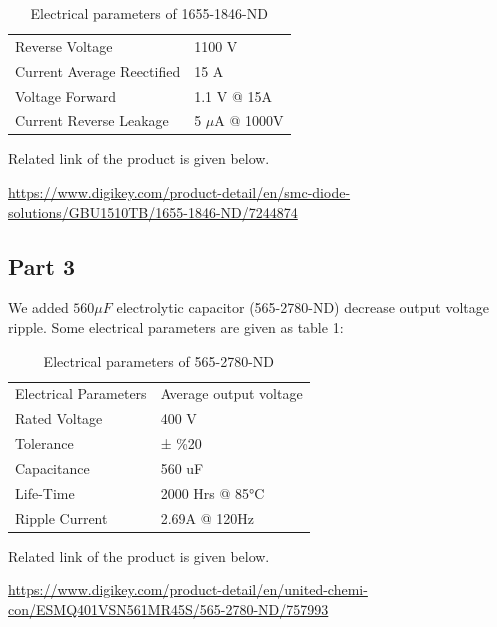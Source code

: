 \documentclass[fleqn, a4paper]{article}
\begin{document}
\begin{table}[H]
\centering
\begin{tabular}{ll}

Reverse Voltage                   & 1100 V               \\
Current Average Reectified        & 15 A                \\
Voltage Forward                   & 1.1 V @ 15A        \\
Current Reverse Leakage           & 5 $\mu$A  @ 1000V         
\end{tabular}
\caption{Electrical parameters of 1655-1846-ND}
\end{table}
Related link of the product is given below.

\url {https://www.digikey.com/product-detail/en/smc-diode-solutions/GBU1510TB/1655-1846-ND/7244874}

\subsection*{Part 3}
We added $560 \mu F $ electrolytic capacitor (565-2780-ND) decrease output voltage ripple. Some electrical parameters are given as table 1:
\begin{table}[H]
\centering
\begin{tabular}{ll}
Electrical Parameters & Average output voltage \\
Rated Voltage         & 400 V                  \\
Tolerance             & ± \%20                 \\
Capacitance           & 560 uF                 \\
Life-Time             & 2000 Hrs @ 85°C        \\
Ripple Current        & 2.69A @ 120Hz         
\end{tabular}
\caption{Electrical parameters of 565-2780-ND}

\end{table}
Related link of the product is given below.

\url{https://www.digikey.com/product-detail/en/united-chemi-con/ESMQ401VSN561MR45S/565-2780-ND/757993}
\end{document}
